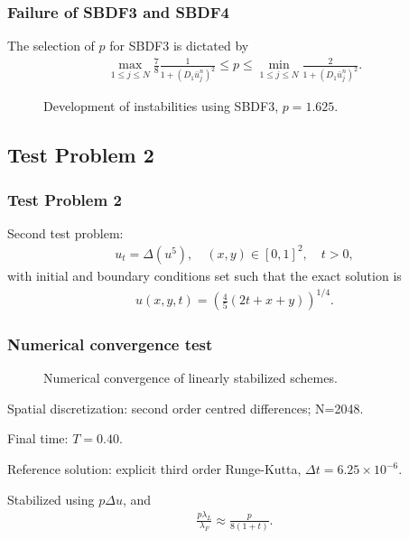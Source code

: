 \documentclass[hyperref={pdfpagelabels=false}]{beamer}
\begin{document}
\begin{frame}
	\frametitle{Failure of SBDF3 and SBDF4} 
	The selection of $p$ for SBDF3 is dictated by 
	\begin{align*}
	\max_{1\leq j\leq N} \frac{7}{8} \frac{1}{1 + (D_1 \bar u^n_j)^2} 
	\leq p
	\leq \min_{1\leq j\leq N} \frac{2}{1 + (D_1 \bar u^n_j)^2}.
	\end{align*}
	\begin{figure}
		\centering 
\caption{Development of instabilities using SBDF3, $p=1.625$.}
	\end{figure}
\end{frame}

\subsection{Test Problem 2}
\begin{frame}
	\frametitle{Test Problem 2} 
Second test problem: 
\begin{align*}
u_t = \Delta(u^5), 
\quad (x,y) \in [0,1]^2, \quad t > 0, 
\end{align*}
with initial and boundary conditions set such that the exact solution is 
\begin{align*}
u(x,y,t) = \left(\frac{4}{5}(2t+x+y) \right)^{1/4}.
\end{align*}
\end{frame}
\begin{frame}
	\frametitle{Numerical convergence test}
	\begin{figure}[t]
		\centering
		\caption{Numerical convergence of linearly stabilized schemes.}
	\end{figure}
	Spatial discretization: second order centred differences; N=2048.
	
	Final time: $T=0.40$. 
	
	Reference solution: explicit third order Runge-Kutta, $\Delta t = 6.25\times 10^{-6}$.
	
	Stabilized using $p\Delta u$, and 
	\begin{align*}
	\frac{p\lambda_L}{\lambda_F} \approx \frac{p}{8(1+t)}.
	\end{align*}
	
\end{frame}
\end{document}
